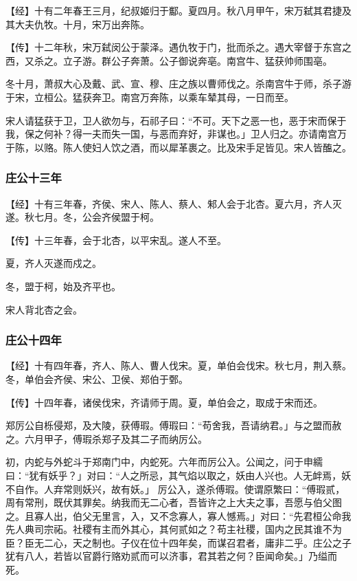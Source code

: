 \documentclass[]{article}
\begin{document}
【经】十有二年春王三月，纪叔姬归于酅。夏四月。秋八月甲午，宋万弑其君捷及其大夫仇牧。十月，宋万出奔陈。

【传】十二年秋，宋万弑闵公于蒙泽。遇仇牧于门，批而杀之。遇大宰督于东宫之西，又杀之。立子游。群公子奔萧。公子御说奔亳。南宫牛、猛获帅师围亳。

冬十月，萧叔大心及戴、武、宣、穆、庄之族以曹师伐之。杀南宫牛于师，杀子游于宋，立桓公。猛获奔卫。南宫万奔陈，以乘车辇其母，一日而至。

宋人请猛获于卫，卫人欲勿与，石祁子曰：``不可。天下之恶一也，恶于宋而保于我，保之何补？得一夫而失一国，与恶而弃好，非谋也。」卫人归之。亦请南宫万于陈，以赂。陈人使妇人饮之酒，而以犀革裹之。比及宋手足皆见。宋人皆醢之。

\hypertarget{header-n448}{%
\subsubsection{庄公十三年}\label{header-n448}}

【经】十有三年春，齐侯、宋人、陈人、蔡人、邾人会于北杏。夏六月，齐人灭遂。秋七月。冬，公会齐侯盟于柯。

【传】十三年春，会于北杏，以平宋乱。遂人不至。

夏，齐人灭遂而戍之。

冬，盟于柯，始及齐平也。

宋人背北杏之会。

\hypertarget{header-n456}{%
\subsubsection{庄公十四年}\label{header-n456}}

【经】十有四年春，齐人、陈人、曹人伐宋。夏，单伯会伐宋。秋七月，荆入蔡。冬，单伯会齐侯、宋公、卫侯、郑伯于鄄。

【传】十四年春，诸侯伐宋，齐请师于周。夏，单伯会之，取成于宋而还。

郑厉公自栎侵郑，及大陵，获傅瑕。傅瑕曰：``苟舍我，吾请纳君。」与之盟而赦之。六月甲子，傅瑕杀郑子及其二子而纳厉公。

初，内蛇与外蛇斗于郑南门中，内蛇死。六年而厉公入。公闻之，问于申繻曰：``犹有妖乎？」对曰：``人之所忌，其气焰以取之，妖由人兴也。人无衅焉，妖不自作。人弃常则妖兴，故有妖。」
厉公入，遂杀傅瑕。使谓原繁曰：``傅瑕贰，周有常刑，既伏其罪矣。纳我而无二心者，吾皆许之上大夫之事，吾愿与伯父图之。且寡人出，伯父无里言，入，又不念寡人，寡人憾焉。」对曰：``先君桓公命我先人典司宗祏。社稷有主而外其心，其何贰如之？苟主社稷，国内之民其谁不为臣？臣无二心，天之制也。子仪在位十四年矣，而谋召君者，庸非二乎。庄公之子犹有八人，若皆以官爵行赂劝贰而可以济事，君其若之何？臣闻命矣。」乃缢而死。
\end{document}
